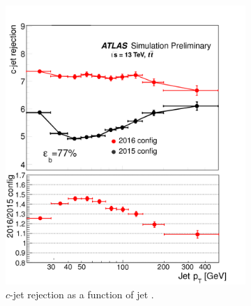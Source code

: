 \begin{figure}[h!]
\centering
\captionsetup{justification=centering}
    \begin{subfigure}[b]{0.4\textwidth}
        \includegraphics[width=\textwidth]{figures/object/c_rej_pt}
        \caption{$c$-jet rejection as a function of jet \pt.}
        \label{fig:obj_c_rej}
    \end{subfigure}
    \quad
    \begin{subfigure}[b]{0.4\textwidth}

\end{subfigure}
\end{figure}
